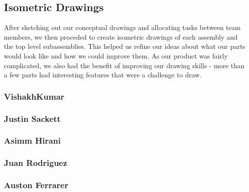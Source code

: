 \subsection{Isometric Drawings}
After sketching out our conceptual drawings and allocating tasks between team members, we then proceded to create isometric drawings of each assembly and the top level subassemblies.
This helped us refine our ideas about what our parts would look like and how we could improve them.
As our product was fairly complicated, we also had the benefit of improving our drawing skills - more than a few parts had interesting features that were a challenge to draw.

\subsubsection{VishakhKumar}

\subsubsection{Justin Sackett}

\subsubsection{Asimm Hirani}

\subsubsection{Juan Rodriguez}

\subsubsection{Auston Ferrarer}
